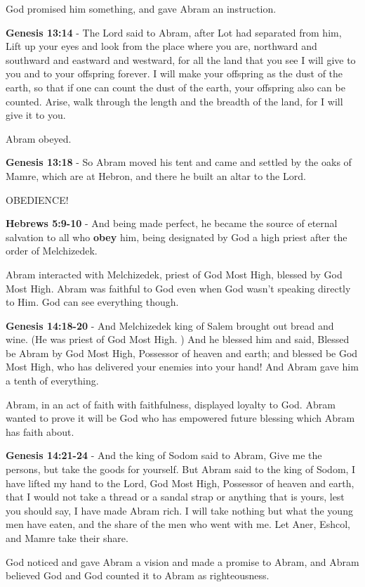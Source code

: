 \documentclass[11pt]{article}
\begin{document}
God promised him something, and gave Abram an instruction.

\textbf{Genesis 13:14} - The Lord said to Abram, after Lot had separated from him, Lift up your eyes and look from the place where you are, northward and southward and eastward and westward, for all the land that you see I will give to you and to your offspring forever. I will make your offspring as the dust of the earth, so that if one can count the dust of the earth, your offspring also can be counted. Arise, walk through the length and the breadth of the land, for I will give it to you.

Abram obeyed.

\textbf{Genesis 13:18} - So Abram moved his tent and came and settled by the oaks of Mamre, which are at Hebron, and there he built an altar to the Lord.

OBEDIENCE!

\textbf{Hebrews 5:9-10} - And being made perfect, he became the source of eternal salvation to all who \textbf{obey} him, being designated by God a high priest after the order of Melchizedek.

Abram interacted with Melchizedek, priest of God Most High, blessed by God Most High. Abram was faithful to God even when God wasn't speaking directly to Him. God can see everything though.

\textbf{Genesis 14:18-20} - And Melchizedek king of Salem brought out bread and wine. (He was priest of God Most High. ) And he blessed him and said, Blessed be Abram by God Most High, Possessor of heaven and earth; and blessed be God Most High, who has delivered your enemies into your hand! And Abram gave him a tenth of everything.

Abram, in an act of faith with faithfulness, displayed loyalty to God. Abram wanted to prove it will be God who has empowered future blessing which Abram has faith about.

\textbf{Genesis 14:21-24} - And the king of Sodom said to Abram, Give me the persons, but take the goods for yourself. But Abram said to the king of Sodom, I have lifted my hand to the Lord, God Most High, Possessor of heaven and earth, that I would not take a thread or a sandal strap or anything that is yours, lest you should say, I have made Abram rich. I will take nothing but what the young men have eaten, and the share of the men who went with me. Let Aner, Eshcol, and Mamre take their share.

God noticed and gave Abram a vision and made a promise to Abram, and Abram believed God and God counted it to Abram as righteousness.
\end{document}

